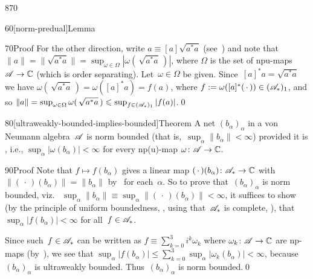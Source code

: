 \begin{parsec}{870}
\begin{point}{60}[norm-predual]{Lemma}
\begin{point}{70}{Proof}
For the other direction,
write $a\equiv [a] \sqrt{a^*a}$ (see~)
and note that $\|a\|=\|\sqrt{a^*a}\|=\sup_{\omega\in \Omega} 
\left|\omega (\,\sqrt{a^*a}\,)\right|$,
where $\Omega$ is the set of  npu-maps $\mathscr{A}\to \mathbb{C}$
(which is order separating).
Let~$\omega\in \Omega$ be given.
Since~$[a]^*a=\sqrt{a^*a}$ 
we have $\omega(\,\sqrt{a^*a}\,)=\omega([a]^*a)=f(a)$,
where $f:=\omega([a]^*(\,\cdot\,))\in (\mathscr{A}_*)_1$,
and so $\|a\|=\sup_{\omega\in\Omega} 
\omega(\,\sqrt{a^*a}\,) \leqslant \sup_{f\in (\mathscr{A}_*)_1}
\left|f(a)\right|$.\qed
\end{point}
\end{point}
\begin{point}{80}[ultraweakly-bounded-implies-bounded]{Theorem}%
A net  $(b_\alpha)_\alpha$
 in a von Neumann algebra~$\mathscr{A}$
is norm bounded
(that is,~$\sup_\alpha \|b_\alpha\|<\infty$)
provided it is , i.e.,%
$\sup_\alpha \left|\omega(b_\alpha)\right|<\infty$
	for every np(u)-map $\omega\colon \mathscr{A}\to \mathbb{C}$.
\begin{point}{90}{Proof}%
Note that $f\mapsto f(b_\alpha)$
gives a linear map $(\,\cdot\,)(b_\alpha)\colon \mathscr{A}_*\to\mathbb{C}$
with $\|(\,\cdot\,)(b_\alpha)\|=\|b_\alpha\|$ 
by~
for each~$\alpha$.
So to prove that~$(b_\alpha)_\alpha$
is norm bounded, viz.~%
$\sup_\alpha \|b_\alpha\|\equiv \sup_\alpha \|(\,\cdot\,)(b_\alpha)\|<\infty$,
it suffices to show
(by the principle of uniform boundedness, ,
using that~$\mathscr{A}_*$ is complete, ),
that $\sup_\alpha \left|f(b_\alpha)\right|<\infty$ for all~$f\in\mathscr{A}_*$.

Since such~$f\in\mathscr{A}_*$
can be written as $f\equiv \sum_{k=0}^3 i^k \omega_k$
where $\omega_k\colon \mathscr{A}\to\mathbb{C}$ are np-maps
(by~),
we see that $\sup_\alpha\left|f(b_\alpha)\right|
\leq \sum_{k=0}^3\sup_\alpha \left|\omega_k(b_\alpha)\right|
<\infty$, because~$(b_\alpha)_\alpha$
is ultraweakly bounded.
Thus~$(b_\alpha)_\alpha$
is norm bounded.\qed
\end{point}
\end{point}
\end{parsec}
